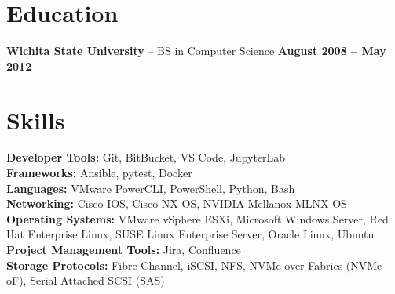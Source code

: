 \documentclass[10pt]{article}       %
\begin{document}

\vspace{-16.5pt}


\section*{Education}
\textbf{\href{https://www.wichita.edu}{Wichita State University}} – BS in Computer Science \hfill \textbf {August 2008 – May 2012} \\



\vspace{-10pt}

\section*{Skills}
\textbf{Developer Tools:} Git, BitBucket, VS Code, JupyterLab \\
\textbf{Frameworks:} Ansible, pytest, Docker \\
\textbf{Languages:} VMware PowerCLI, PowerShell, Python, Bash \\
\textbf{Networking:} Cisco IOS, Cisco NX-OS, NVIDIA Mellanox MLNX-OS \\
\textbf{Operating Systems:} VMware vSphere ESXi, Microsoft Windows Server, Red Hat Enterprise Linux, SUSE Linux Enterprise Server, Oracle Linux, Ubuntu \\
\textbf{Project Management Tools:} Jira, Confluence \\
\textbf{Storage Protocols:} Fibre Channel, iSCSI, NFS, NVMe over Fabrics (NVMe-oF), Serial Attached SCSI (SAS)
\end{document}
